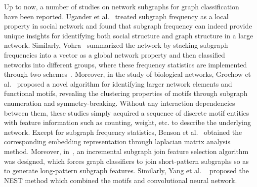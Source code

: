 \documentclass[10pt,journal,compsoc]{IEEEtran}
\begin{document}
Up to now, a number of studies on network subgraphs for graph classification have been reported. Ugander et al.~\cite{ugander2013subgraph} treated subgraph frequency as a local property in social network and found that subgraph frequency can indeed provide unique insights for identifying both social structure and graph structure in a large network. Similarly, Vohra~\cite{vohrasubgraph} summarized the network by stacking subgraph frequencies into a vector as a global network property and then classified networks into different groups, where these frequency statistics are implemented through two schemes~\cite{ugander2013subgraph, jha2015path}. Moreover, in the study of biological networks, Grochow et al.~\cite{grochow2007network} proposed a novel algorithm for identifying larger network elements and functional motifs, revealing the clustering properties of motifs through subgraph enumeration and symmetry-breaking.
Without any interaction dependencies between them, these studies simply acquired a sequence of discrete motif entities with feature information such as counting, weight, etc. to describe the underlying network.
Except for subgraph frequency statistics, Benson et al.~\cite{benson2016higher} obtained the corresponding embedding representation through laplacian matrix analysis method. Moreover, in~\cite{wang2017incremental}, an incremental subgraph join feature selection algorithm was designed, which forces graph classifiers to join short-pattern subgraphs so as to generate long-pattern subgraph features. Similarly, Yang et al. ~\cite{yang2018node} proposed the NEST method which combined the motifs and convolutional neural network.
\end{document}
